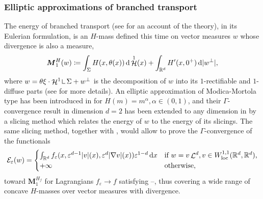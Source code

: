 \documentclass[JEP,XML,SOM,Unicode,published]{cedram}
\theoremstyle{plain}
\theoremstyle{definition}
\newcommand{\dd}{\mathop{}\mathopen{}\mathrm{d}}
\newcommand{\R}{\mathbb{R}}
\newcommand{\ener}{\mathcal{E}}
\newcommand{\mass}{\boldsymbol{M}}
\newcommand{\mres}{\mathop{\hbox{\vrule height 6pt width .5pt depth 0pt \vrule height .5pt width 4pt depth 0pt}}\nolimits}
\newcommand{\loc}{\mathrm{loc}}
\newcommand{\eps}{\varepsilon}
\DeclarePairedDelimiter{\abs}{\lvert}{\rvert}
\DeclareMathOperator{\hdm}{\mathcal{H}}
\DeclareMathOperator{\lbm}{\mathcal{L}}
\begin{document}
\subsubsection*{Elliptic approximations of branched transport}
The energy of branched transport (see \cite{bernotOptimalTransportationNetworks2009} for an account of the theory), in its Eulerian formulation, is an $H$-mass defined this time on vector measures $w$ whose divergence is also a measure,
\begin{equation}
\mass_1^H(w)\coloneqq\int_\Sigma H(x,\theta(x))\dd\hdm^1(x)+\int_{\R^d} H'(x,0^+)\dd\abs{w^\perp},
\end{equation}
where $w = \theta \xi \cdot \hdm^1 \mres \Sigma + w^\perp$ is the decomposition of $w$ into its $1$-rectifiable and $1$\nobreakdash-diffuse parts (see  for more details). An elliptic approximation of Modica-Mortola type has been introduced in \cite{oudetModicaMortolaApproximationBranched2011} for $H(m) = m^\alpha, \alpha \in (0,1)$, and their $\Gamma$\nobreakdash-con\-vergence result in dimension $d=2$ has been extended to any dimension in \cite{monteilEllipticApproximationsSingular2015} by a slicing method which relates the energy of $w$ to the energy of its slicings. The same slicing method, together with , would allow to prove the $\Gamma$-convergence of the functionals
\begin{equation}
\ener_\eps(w)=
\begin{cases}
\int_{\R^d}f_\eps(x,\eps^{d-1} \abs{v}(x), \eps^{d}\abs{\nabla v}(x)) \eps^{1-d} \dd x &\text{if \(w = v\lbm^d , v\in W^{1,1}_\loc(\R^d,\R^d)\),}\\
+\infty&\text{otherwise,}
\end{cases}
\end{equation}
toward \(\mass_1^{H_f}\) for Lagrangians \(f_\eps\to f\) satisfying --, thus covering a wide range of concave $H$-masses over vector measures with divergence.
\end{document}
